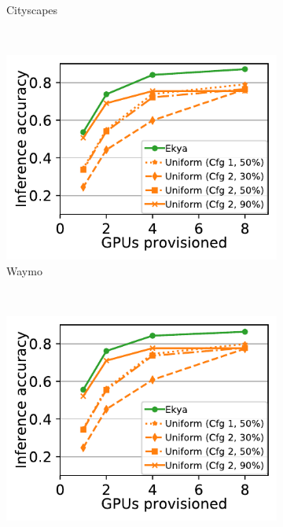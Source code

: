 \begin{figure}
\begin{subfigure}[t]{0.47\linewidth}
    \caption{\small Cityscapes}
    \label{fig:scalability-gpus-cityscapes-golden}
  \end{subfigure}
  ~~~
  \begin{subfigure}[t]{0.47\linewidth}
    \centering
    \includegraphics[width=\linewidth]{ekya/results/multicam/waymo_scheduler_comparison_across_resources.pdf} 
    \caption{\small Waymo}
    \label{fig:scalability-gpus-waymo-golden}
  \end{subfigure}
  \\
  \begin{subfigure}[t]{0.47\linewidth}
    \centering
    \includegraphics[width=\linewidth]{ekya/results/multicam/las_vegas_scheduler_comparison_across_resources.pdf} 

\end{subfigure}
\end{figure}
